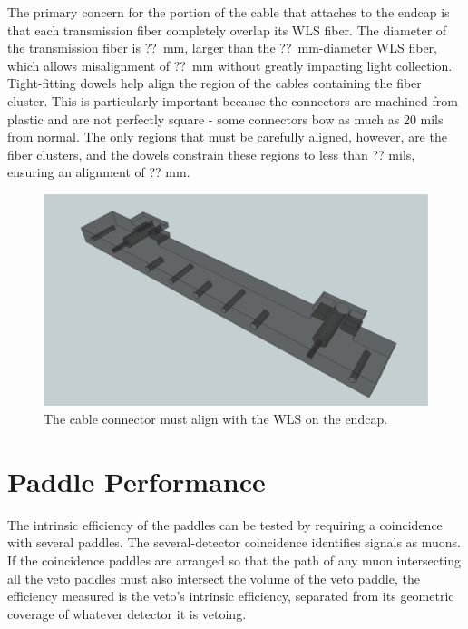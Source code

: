 The primary concern for the portion of the cable that attaches to the endcap is that each transmission fiber completely overlap its WLS fiber.  The diameter of the transmission fiber is ??~mm, larger than the ??~mm-diameter WLS fiber, which allows misalignment of ??~mm without greatly impacting light collection.  Tight-fitting dowels help align the region of the cables containing the fiber cluster.  This is particularly important because the connectors are machined from plastic and are not perfectly square - some connectors bow as much as 20 mils from normal.  The only regions that must be carefully aligned, however, are the fiber clusters, and the dowels constrain these regions to less than ?? mils, ensuring an alignment of ?? mm.
\begin{figure}[htp]
\centering
\includegraphics[width=1.0\textwidth]{figures/paddle_connector.eps}
\caption{The cable connector must align with the WLS on the endcap.}
\label{fig:paddleAssembly}
\end{figure}


\section{Paddle Performance}
\label{sec:singleVeto}

The intrinsic efficiency of the paddles can be tested by requiring a coincidence with several paddles.  The several-detector coincidence identifies signals as muons.  If the coincidence paddles are arranged so that the path of any muon intersecting all the veto paddles must also intersect the volume of the veto paddle, the efficiency measured is the veto's intrinsic efficiency, separated from its geometric coverage of whatever detector it is vetoing.

